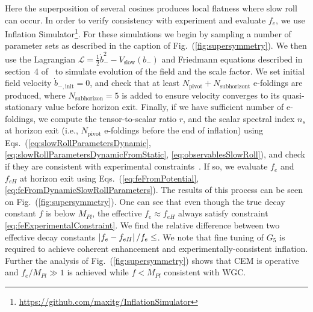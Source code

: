 \documentclass[12pt]{article}
\begin{document}
Here the superposition of several cosines produces local flatness where slow roll can occur.
In order to verify consistency with experiment and evaluate $f_e$, we use Inflation Simulator\footnote{\url{https://github.com/maxitg/InflationSimulator}}.
For these simulations we begin by sampling a number of parameter sets as described in the caption of Fig.~(\ref{fig:supersymmetry}).
We then use the Lagrangian $\mathcal{L} = \frac{1}{2} \dot b_-^2 - V_\text{slow}\left(b_-\right)$ and Friedmann equations described in section~4 of~\cite{Nath:2018xxe} to simulate evolution of the field and the scale factor.
We set initial field velocity $\dot b_{-, \text{init}} = 0$, and check that at least $N_\text{pivot} + N_\text{subhorizont}$ e-foldings are produced, where $N_\text{subhorizon} = 5$ is added to ensure velocity converges to its quasi-stationary value before horizon exit.
Finally, if we have sufficient number of e-foldings, we compute the tensor-to-scalar ratio $r$, and the scalar spectral index $n_s$ at horizon exit (i.e., $N_\text{pivot}$ e-foldings before the end of inflation) using Eqs.~(\ref{eq:slowRollParametersDynamic}, \ref{eq:slowRollParametersDynamicFromStatic}, \ref{eq:observablesSlowRoll}), and check if they are consistent with experimental constraints~\cite{Akrami:2018odb}.
If so, we evaluate $f_e$ and $f_{eH}$ at horizon exit using Eqs.~(\ref{eq:feFromPotential}, \ref{eq:feFromDynamicSlowRollParameters}).
The results of this process can be seen on Fig.~(\ref{fig:supersymmetry}).
One can see that even though the true decay constant $f$ is below $M_{Pl}$, the effective $f_e \approx f_{eH}$ always satisfy constraint \ref{eq:feExperimentalConstraint}.
We find the relative difference between two effective decay constants $\left|f_e - f_{eH}\right| / f_e \le \protect$.
We note that fine tuning of $G_5$ is required to achieve coherent enhancement and experimentally-consistent inflation.
Further the analysis of Fig.~(\ref{fig:supersymmetry}) shows that CEM is operative and $f_e / M_{Pl} \gg 1$ is achieved while $f < M_{Pl}$ consistent with WGC.
\end{document}

